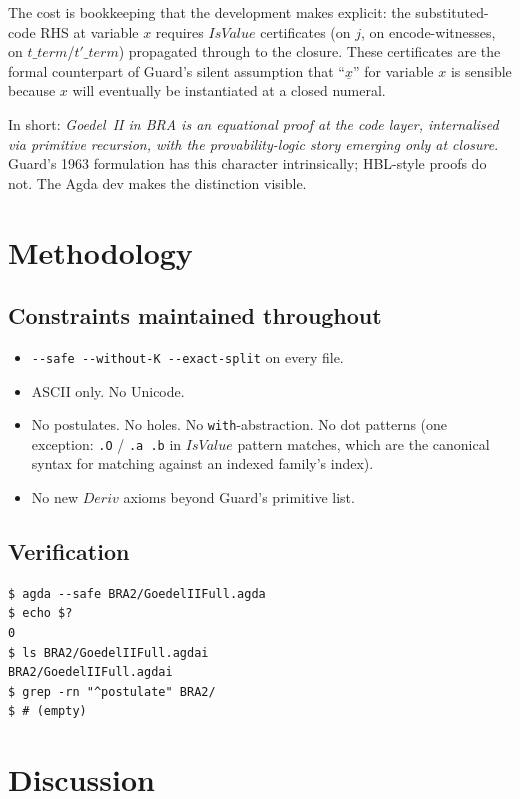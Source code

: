 \documentclass[11pt]{article}
\begin{document}
The cost is bookkeeping that the development makes explicit: the
substituted-code RHS at variable $x$ requires $\mathit{IsValue}$
certificates (on $j$, on encode-witnesses, on $t\_term$/$t'\_term$)
propagated through to the closure.  These certificates are the formal
counterpart of Guard's silent assumption that ``$\underline{x}$'' for variable
$x$ is sensible because $x$ will eventually be instantiated at a
closed numeral.

In short: \emph{Goedel~II in BRA is an equational proof at the code
layer, internalised via primitive recursion, with the
provability-logic story emerging only at closure}.  Guard's 1963
formulation has this character intrinsically; HBL-style proofs do not.
The Agda dev makes the distinction visible.

\section{Methodology}

\subsection{Constraints maintained throughout}

\begin{itemize}
  \item \verb|--safe --without-K --exact-split| on every file.
  \item ASCII only.  No Unicode.
  \item No postulates.  No holes.  No \verb|with|-abstraction.  No dot patterns
        (one exception: \verb|.O| / \verb|.a .b| in $\mathit{IsValue}$ pattern matches,
        which are the canonical syntax for matching against an indexed family's
        index).
  \item No new $\mathit{Deriv}$ axioms beyond Guard's primitive list.
\end{itemize}

\subsection{Verification}

\begin{verbatim}
$ agda --safe BRA2/GoedelIIFull.agda
$ echo $?
0
$ ls BRA2/GoedelIIFull.agdai
BRA2/GoedelIIFull.agdai
$ grep -rn "^postulate" BRA2/
$ # (empty)
\end{verbatim}

\section{Discussion}
\end{document}
